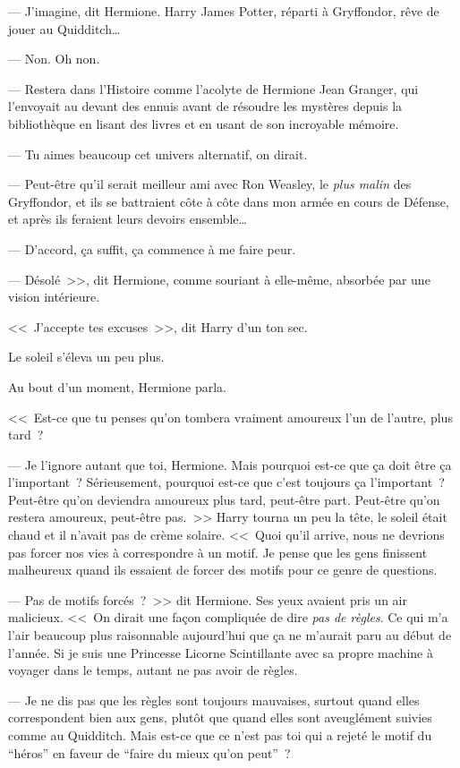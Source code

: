 --- J'imagine, dit Hermione. Harry James Potter, réparti à Gryffondor, rêve de jouer au Quidditch…

--- Non. Oh non.

--- Restera dans l'Histoire comme l'acolyte de Hermione Jean Granger, qui l'envoyait au devant des ennuis avant de résoudre les mystères depuis la bibliothèque en lisant des livres et en usant de son incroyable mémoire.

--- Tu aimes beaucoup cet univers alternatif, on dirait.

--- Peut-être qu'il serait meilleur ami avec Ron Weasley, le \emph{plus malin} des Gryffondor, et ils se battraient côte à côte dans mon armée en cours de Défense, et après ils feraient leurs devoirs ensemble…

--- D'accord, ça suffit, ça commence à me faire peur.

--- Désolé~>>, dit Hermione, comme souriant à elle-même, absorbée par une vision intérieure.

<<~J'accepte tes excuses~>>, dit Harry d'un ton sec.

Le soleil s'éleva un peu plus.

Au bout d'un moment, Hermione parla.

<<~Est-ce que tu penses qu'on tombera vraiment amoureux l'un de l'autre, plus tard~?

--- Je l'ignore autant que toi, Hermione. Mais pourquoi est-ce que ça doit être ça l'important~? Sérieusement, pourquoi est-ce que c'est toujours ça l'important~? Peut-être qu'on deviendra amoureux plus tard, peut-être part. Peut-être qu'on restera amoureux, peut-être pas.~>> Harry tourna un peu la tête, le soleil était chaud et il n'avait pas de crème solaire. <<~Quoi qu'il arrive, nous ne devrions pas forcer nos vies à correspondre à un motif. Je pense que les gens finissent malheureux quand ils essaient de forcer des motifs pour ce genre de questions.

--- Pas de motifs forcés~?~>> dit Hermione. Ses yeux avaient pris un air malicieux. <<~On dirait une façon compliquée de dire \emph{pas de règles}. Ce qui m'a l'air beaucoup plus raisonnable aujourd'hui que ça ne m'aurait paru au début de l'année. Si je suis une Princesse Licorne Scintillante avec sa propre machine à voyager dans le temps, autant ne pas avoir de règles.

--- Je ne dis pas que les règles sont toujours mauvaises, surtout quand elles correspondent bien aux gens, plutôt que quand elles sont aveuglément suivies comme au Quidditch. Mais est-ce que ce n'est pas toi qui a rejeté le motif du “héros” en faveur de “faire du mieux qu'on peut”~?

